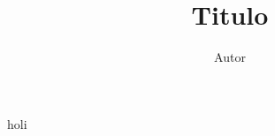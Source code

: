 \documentclass{article}
\title{Titulo}
\author{Autor}
\date{}
\begin{document}
\maketitle

holi





\end{document}
